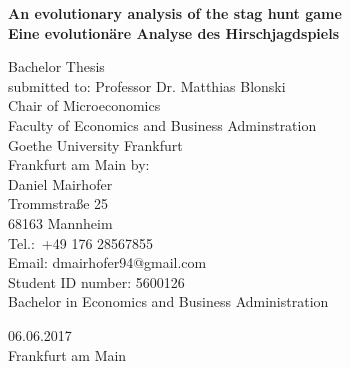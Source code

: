 \thispagestyle{empty}
\vspace*{15mm}
\begin{center}
	\textbf{\Huge An evolutionary analysis of the stag hunt game}\\
    \vspace{5mm}
    \textbf{\large Eine evolutionäre Analyse des Hirschjagdspiels}\\
    \end{center}
\begin{center}
\vskip 0.5cm
	\large Bachelor Thesis \\	
\vskip 1.5cm	
	submitted to:
\vskip 1cm
Professor Dr. Matthias Blonski\\
Chair of Microeconomics\\
Faculty of Economics and Business Adminstration\\
Goethe University Frankfurt\\
Frankfurt am Main
\vskip 1cm
by:  \\
\vskip 0.5cm
Daniel Mairhofer\\
Trommstraße 25\\
68163 Mannheim\\
Tel.:\ +49 176 28567855 \\
Email: dmairhofer94@gmail.com\\
Student ID number: 5600126\\
Bachelor in Economics and Business Administration 
\end{center}
\vskip 1.5cm
\begin{center}
\large{06.06.2017} \\
\large{Frankfurt am Main}
\end{center}



